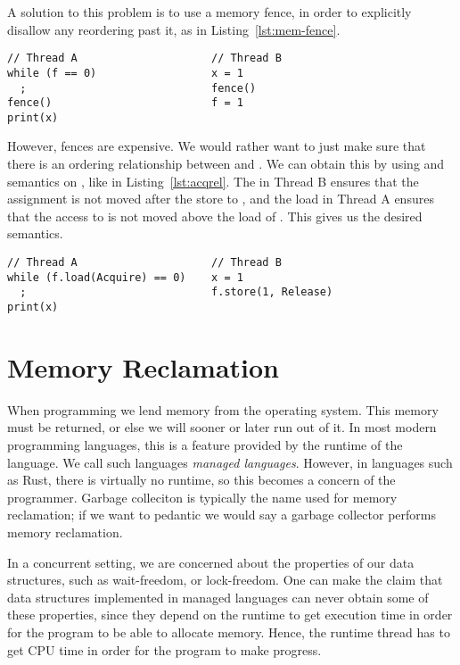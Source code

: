 \documentclass[a4paper,twoside]{report}
\begin{document}
A solution to this problem is to use a memory fence, in order to explicitly
disallow any reordering past it, as in Listing~\ref{lst:mem-fence}.

\begin{lstlisting}[caption=Memory fence for synchronization,label=lst:mem-fence]
// Thread A                     // Thread B
while (f == 0)                  x = 1
  ;                             fence()
fence()                         f = 1
print(x)
\end{lstlisting}
However, fences are expensive. We would rather want to just make sure that
there is an ordering relationship between  and . We can obtain
this by using  and  semantics on , like in
Listing~\ref{lst:acqrel}. The  in Thread B ensures that the
assignment  is not moved after the store to , and the
 load in Thread A ensures that the access to  is not moved
above the load of . This gives us the desired semantics.
\begin{lstlisting}[caption=Synchronization using orderings,label=lst:acqrel]
// Thread A                     // Thread B
while (f.load(Acquire) == 0)    x = 1
  ;                             f.store(1, Release)
print(x)
\end{lstlisting}



\chapter{Memory Reclamation}

When programming we lend memory from the operating system. This memory must be
returned, or else we will sooner or later run out of it.  In most modern
programming languages, this is a feature provided by the runtime of the
language.  We call such languages \emph{managed languages}.  However, in
languages such as Rust, there is virtually no runtime, so this becomes a
concern of the programmer.  Garbage colleciton is typically the name used for
memory reclamation; if we want to pedantic we would say a garbage collector
performs memory reclamation.

In a concurrent setting, we are concerned about the properties of our data
structures,  such as wait-freedom, or lock-freedom.
 One can make the claim that data structures
implemented in managed languages can never obtain some of these properties,
since they depend on the runtime to get execution time in order for the program
to be able to allocate memory.  Hence, the runtime thread has to get CPU time
in order for the program to make progress.  
\end{document}
